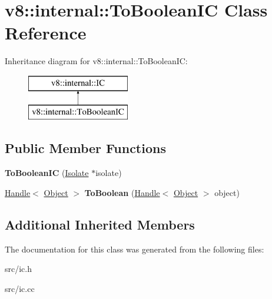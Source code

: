 \hypertarget{classv8_1_1internal_1_1_to_boolean_i_c}{}\section{v8\+:\+:internal\+:\+:To\+Boolean\+I\+C Class Reference}
\label{classv8_1_1internal_1_1_to_boolean_i_c}
Inheritance diagram for v8\+:\+:internal\+:\+:To\+Boolean\+I\+C\+:\begin{figure}[H]
\begin{center}
\leavevmode
\includegraphics[height=2.000000cm]{classv8_1_1internal_1_1_to_boolean_i_c}
\end{center}
\end{figure}
\subsection*{Public Member Functions}
\begin{DoxyCompactItemize}
\item 
\hypertarget{classv8_1_1internal_1_1_to_boolean_i_c_a3cf1613dc23aa40758de8f5431e519a6}{}{\bfseries To\+Boolean\+I\+C} (\hyperlink{classv8_1_1internal_1_1_isolate}{Isolate} $\ast$isolate)\label{classv8_1_1internal_1_1_to_boolean_i_c_a3cf1613dc23aa40758de8f5431e519a6}

\item 
\hypertarget{classv8_1_1internal_1_1_to_boolean_i_c_a8dc50fab23d6720e8da58421a9280c5e}{}\hyperlink{classv8_1_1internal_1_1_handle}{Handle}$<$ \hyperlink{classv8_1_1internal_1_1_object}{Object} $>$ {\bfseries To\+Boolean} (\hyperlink{classv8_1_1internal_1_1_handle}{Handle}$<$ \hyperlink{classv8_1_1internal_1_1_object}{Object} $>$ object)\label{classv8_1_1internal_1_1_to_boolean_i_c_a8dc50fab23d6720e8da58421a9280c5e}

\end{DoxyCompactItemize}
\subsection*{Additional Inherited Members}


The documentation for this class was generated from the following files\+:\begin{DoxyCompactItemize}
\item 
src/ic.\+h\item 
src/ic.\+cc\end{DoxyCompactItemize}

